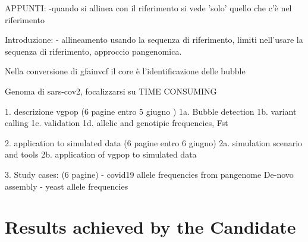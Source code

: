 APPUNTI:
-quando si allinea con il riferimento si vede 'solo' quello che c'è nel riferimento

\vspace{2cm}
Introduzione:
- allineamento usando la sequenza di riferimento, limiti nell'usare la sequenza di riferimento, approccio pangenomica.

Nella conversione di gfainvcf il core è l'identificazione delle bubble

Genoma di sars-cov2, focalizzarsi su TIME CONSUMING   



1. descrizione vgpop (6 pagine entro 5 giugno ) 
1a. Bubble detection
1b. variant calling 
1c. validation 
1d. allelic and genotipic frequencies, Fst 

2. application to simulated data (6 pagine entro 6 giugno) 
2a. simulation scenario and tools 
2b. application of vgpop to simulated data 

3. Study cases: (6 pagine) 
- covid19
allele frequencies from pangenome 
De-novo assembly
- yeast 
allele frequencies


\chapter{Results achieved by the Candidate} %

\label{Chapter5} %







